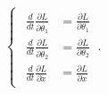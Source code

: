 \documentclass[preview, convert={outfile=\jobname.svg}]{standalone}
\begin{document}
\begin{equation*}
    \begin{cases}
        \begin{aligned}
            \displaystyle\frac{d}{dt}\frac{\partial L}{\partial \dot{\theta_1}} &= \frac{\partial L}{\partial \theta_1} \\
            \displaystyle\frac{d}{dt}\frac{\partial L}{\partial \dot{\theta_2}} &= \frac{\partial L}{\partial \theta_2} \\
            \displaystyle\frac{d}{dt}\frac{\partial L}{\partial \dot{x}} &= \frac{\partial L}{\partial x}
        \end{aligned}\ .
    \end{cases}
\end{equation*}
\end{document}

